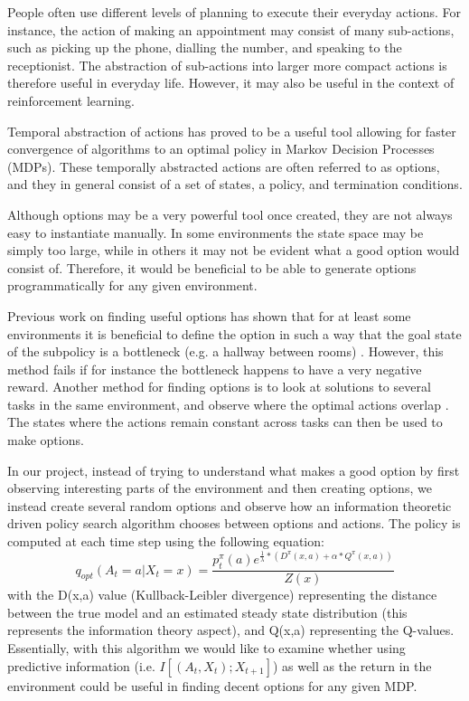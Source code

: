 \documentclass{acm_proc_article-sp}
\begin{document}
People often use different levels of planning to execute their everyday actions. For instance, the action of making an appointment may consist of many sub-actions, such as picking up the phone, dialling the number, and speaking to the receptionist. The abstraction of sub-actions into larger more compact actions is therefore useful in everyday life. However, it may also be useful in the context of reinforcement learning.

Temporal abstraction of actions has proved to be a useful tool allowing for faster convergence of algorithms to an optimal policy in Markov Decision Processes (MDPs). These temporally abstracted actions are often referred to as options, and they in general consist of a set of states, a policy, and termination conditions. 

Although options may be a very powerful tool once created, they are not always easy to instantiate manually. In some environments the state space may be simply too large, while in others it may not be evident what a good option would consist of. Therefore, it would be beneficial to be able to generate options programmatically for any given environment.

Previous work on finding useful options has shown that for at least some environments it is beneficial to define the option in such a way that the goal state of the subpolicy is a bottleneck (e.g. a hallway between rooms) \cite{solwayoptimal}. However, this method fails if for instance the bottleneck happens to have a very negative reward. Another method for finding options is to look at solutions to several tasks in the same environment, and observe where the optimal actions overlap \cite{pickett2002policyblocks}. The states where the actions remain constant across tasks can then be used to make options.

In our project, instead of trying to understand what makes a good option by first observing interesting parts of the environment and then creating options, we instead create several random options and observe how an information theoretic driven policy search algorithm \cite{still} chooses between options and actions. The policy is computed at each time step using the following equation: $$q_{opt}(A_t = a| X_t = x) = \frac{p^\pi_t(a)e^{\frac{1}{\lambda}*(D^\pi(x,a) + \alpha*Q^\pi(x,a))}}{Z(x)}$$ with the D(x,a) value (Kullback-Leibler divergence) representing the distance between the true model and an estimated steady state distribution (this represents the information theory aspect), and Q(x,a) representing the Q-values. Essentially, with this algorithm we would like to examine whether using predictive information (i.e. $I[(A_t,X_t); X_{t+1}]$) as well as the return in the environment could be useful in finding decent options for any given MDP.
\end{document}
